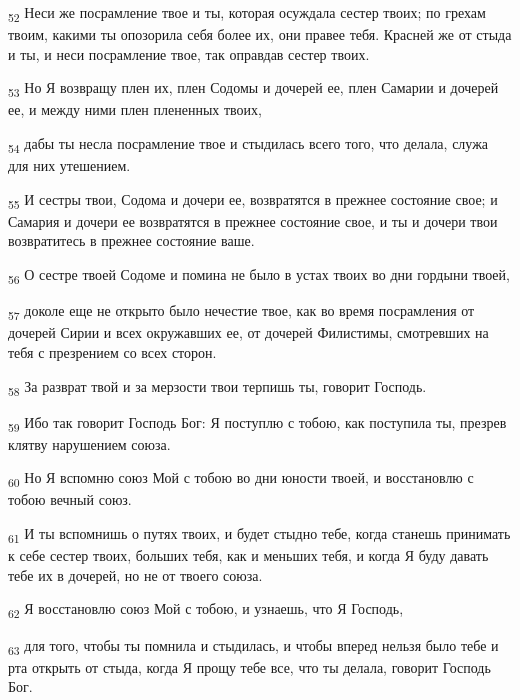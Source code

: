 \begin{tcolorbox}
\textsubscript{52} Неси же посрамление твое и ты, которая осуждала сестер твоих; по грехам твоим, какими ты опозорила себя более их, они правее тебя. Красней же от стыда и ты, и неси посрамление твое, так оправдав сестер твоих.
\end{tcolorbox}
\begin{tcolorbox}
\textsubscript{53} Но Я возвращу плен их, плен Содомы и дочерей ее, плен Самарии и дочерей ее, и между ними плен плененных твоих,
\end{tcolorbox}
\begin{tcolorbox}
\textsubscript{54} дабы ты несла посрамление твое и стыдилась всего того, что делала, служа для них утешением.
\end{tcolorbox}
\begin{tcolorbox}
\textsubscript{55} И сестры твои, Содома и дочери ее, возвратятся в прежнее состояние свое; и Самария и дочери ее возвратятся в прежнее состояние свое, и ты и дочери твои возвратитесь в прежнее состояние ваше.
\end{tcolorbox}
\begin{tcolorbox}
\textsubscript{56} О сестре твоей Содоме и помина не было в устах твоих во дни гордыни твоей,
\end{tcolorbox}
\begin{tcolorbox}
\textsubscript{57} доколе еще не открыто было нечестие твое, как во время посрамления от дочерей Сирии и всех окружавших ее, от дочерей Филистимы, смотревших на тебя с презрением со всех сторон.
\end{tcolorbox}
\begin{tcolorbox}
\textsubscript{58} За разврат твой и за мерзости твои терпишь ты, говорит Господь.
\end{tcolorbox}
\begin{tcolorbox}
\textsubscript{59} Ибо так говорит Господь Бог: Я поступлю с тобою, как поступила ты, презрев клятву нарушением союза.
\end{tcolorbox}
\begin{tcolorbox}
\textsubscript{60} Но Я вспомню союз Мой с тобою во дни юности твоей, и восстановлю с тобою вечный союз.
\end{tcolorbox}
\begin{tcolorbox}
\textsubscript{61} И ты вспомнишь о путях твоих, и будет стыдно тебе, когда станешь принимать к себе сестер твоих, больших тебя, как и меньших тебя, и когда Я буду давать тебе их в дочерей, но не от твоего союза.
\end{tcolorbox}
\begin{tcolorbox}
\textsubscript{62} Я восстановлю союз Мой с тобою, и узнаешь, что Я Господь,
\end{tcolorbox}
\begin{tcolorbox}
\textsubscript{63} для того, чтобы ты помнила и стыдилась, и чтобы вперед нельзя было тебе и рта открыть от стыда, когда Я прощу тебе все, что ты делала, говорит Господь Бог.
\end{tcolorbox}
